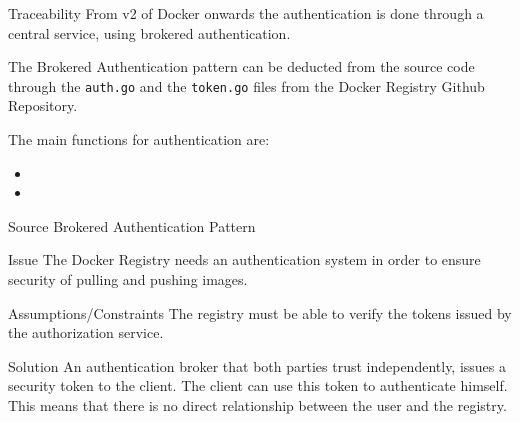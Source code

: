 \begin{patdescription}

\item[Traceability]
From v2 of Docker onwards the authentication is done through a central service, using brokered authentication\cite{dockauth}.

The Brokered Authentication pattern can be deducted from the source code through the \verb|auth.go| and the \verb|token.go| files from the Docker Registry Github Repository.

The main functions for authentication are:
\begin{itemize}
\item {}

\item {}
\end{itemize}

\item[Source]
Brokered Authentication Pattern\cite{brokeredauth}

\item[Issue] The Docker Registry needs an authentication system in order to ensure security of pulling and pushing images.

\item[Assumptions/Constraints] 
The registry must be able to verify the tokens issued by the authorization service.


\item[Solution] 
An authentication broker that both parties trust independently, issues a security token to the client. The client can use this token to authenticate himself. This means that there is no direct relationship between the user and the registry.


\end{patdescription}
